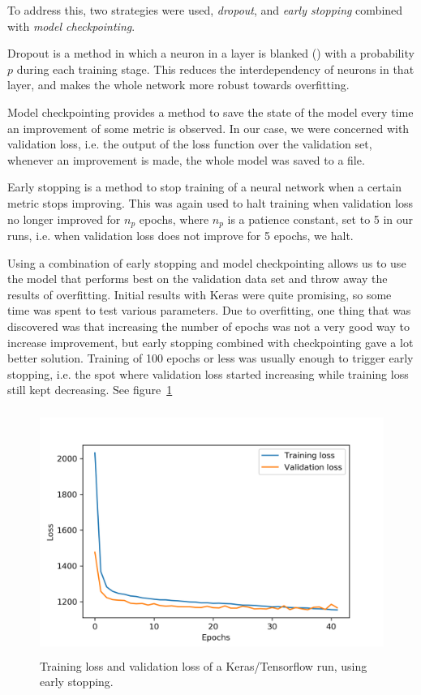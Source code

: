 \documentclass[a4paper]{article}
\begin{document}
To address this, two strategies were used, \textit{dropout}, and \textit{early stopping } combined with \textit{model checkpointing}. 

Dropout is a method in which  a neuron in a layer is blanked () with a probability $p$ during each training stage.  This reduces the interdependency of neurons in that layer, and makes the whole network more robust towards overfitting.

Model checkpointing provides a method to save the state of the model every time an improvement of some metric is observed.  In our case, we were concerned with validation loss, i.e. the output of the loss function over the validation set, whenever an improvement is made, the whole model was saved to a file.  

Early stopping is a method to stop training of a neural network when a certain metric stops improving.  This was again used to halt training when validation loss no longer improved for $n_p$ epochs, where $n_p$ is a patience constant, set to 5 in our runs, i.e. when validation loss does not improve for 5 epochs, we halt.  

Using a combination of early stopping and model checkpointing allows us to use the model that performs best on the validation data set and throw away the results of overfitting.  Initial results with Keras were quite promising, so some time was spent to test various parameters.  Due to overfitting, one thing that was discovered was that increasing the number of epochs was not a very good way to increase improvement, but early stopping combined with checkpointing gave a lot better solution.  Training of 100 epochs or less was usually enough to trigger early stopping, i.e. the spot where validation loss started increasing while training loss still kept decreasing. See figure~\ref{fig:keras-overfitting}
\begin{figure}[H]
	\centering
	\includegraphics[width=15cm,height=8cm,keepaspectratio]{Images/keras-overfitting.png}
	\caption{Training loss and validation loss of a Keras/Tensorflow run, using early stopping.}
	\label{fig:keras-overfitting}
\end{figure}
\end{document}
